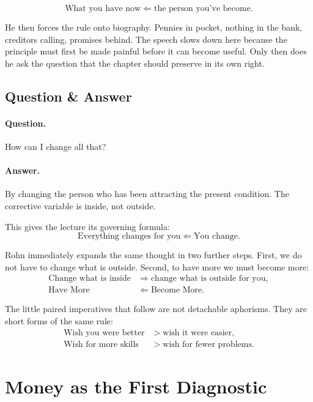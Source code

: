 \begin{equation}
\text{What you have now} \Longleftarrow \text{the person you've become}.
\end{equation}

He then forces the rule onto biography. Pennies in pocket, nothing in the bank, creditors calling, promises behind. The speech slows down here because the principle must first be made painful before it can become useful. Only then does he ask the question that the chapter should preserve in its own right.

\subsection{Question \& Answer}

\paragraph{Question.} How can I change all that?

\paragraph{Answer.} By changing the person who has been attracting the present condition. The corrective variable is inside, not outside.

This gives the lecture its governing formula:
\begin{equation}
\text{Everything changes for you} \Longleftarrow \text{You change}.
\end{equation}

Rohn immediately expands the same thought in two further steps. First, we do not have to change what is outside. Second, to have more we must become more:
\begin{align}
\text{Change what is inside} &\Longrightarrow \text{change what is outside for you},\\
\text{Have More} &\Longleftarrow \text{Become More}.
\end{align}

The little paired imperatives that follow are not detachable aphorisms. They are short forms of the same rule:
\begin{align}
\text{Wish you were better} &> \text{wish it were easier},\\
\text{Wish for more skills} &> \text{wish for fewer problems}.
\end{align}

\section{Money as the First Diagnostic}

